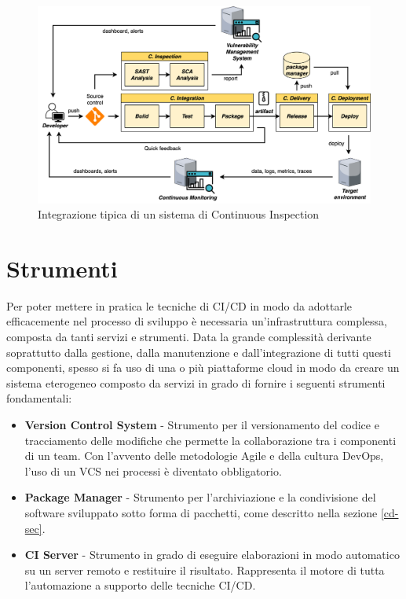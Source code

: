 \begin{figure}[H]
    \centering
    \includegraphics[width=1\textwidth]{img/cinspection-pipeline.png}
    \caption{Integrazione tipica di un sistema di Continuous Inspection}
    \label{ci-inspection-pipeline}
\end{figure}

\section{Strumenti}
\label{devops-tools-sec}
Per poter mettere in pratica le tecniche di CI/CD in modo da adottarle efficacemente nel processo di sviluppo è necessaria un'infrastruttura complessa, composta da tanti servizi e strumenti. 
Data la grande complessità derivante soprattutto dalla gestione, 
dalla manutenzione e dall'integrazione di tutti questi componenti, 
spesso si fa uso di una o più piattaforme cloud in modo da creare un sistema eterogeneo composto da servizi in grado di fornire i seguenti strumenti fondamentali:

\begin{itemize}
    \item \textbf{Version Control System} - Strumento per il versionamento del codice e tracciamento delle modifiche che permette la collaborazione tra i componenti di un team. Con l'avvento delle metodologie Agile e della cultura DevOps, l'uso di un VCS nei processi è diventato obbligatorio.
    
    \item \textbf{Package Manager} - Strumento per l'archiviazione e la condivisione del software sviluppato sotto forma di pacchetti, come descritto nella sezione \ref{cd-sec}.
    
    \item \textbf{CI Server} - Strumento in grado di eseguire elaborazioni in modo automatico su un server remoto e restituire il risultato. Rappresenta il motore di tutta l'automazione a supporto delle tecniche CI/CD.
\end{itemize}

